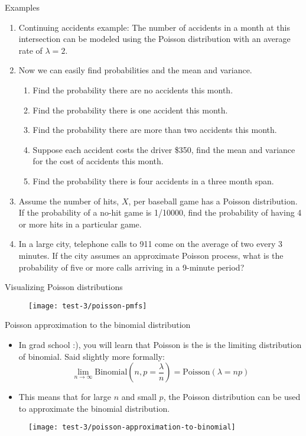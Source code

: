\documentclass{article}
\begin{document}
Examples\bigskip
\begin{enumerate}
    \item Continuing accidents example: The number of accidents in a month at this intersection can be modeled using the Poisson distribution with an average rate of $\lambda = 2$.\vspace{20pt}
    \item[] Now we can easily find probabilities and the mean and variance.
    \begin{enumerate}
        \item Find the probability there are no accidents this month.\vspace{60pt}
        \item Find the probability there is one accident this month.\vspace{60pt}
        \item Find the probability there are more than two accidents this month.\vspace{60pt}
        \item Suppose each accident costs the driver \$350, find the mean and variance for the cost of accidents this month.\vspace{180pt}
        \item Find the probability there is four accidents in a three month span.\vspace{60pt}
    \end{enumerate}
    \item Assume the number of hits, $X$, per baseball game has a Poisson distribution. If the probability of a no-hit game is 1/10000, find the probability of having 4 or more hits in a particular game.\vspace{250pt}
    \item In a large city, telephone calls to 911 come on the average of two every 3 minutes. If the city assumes an approximate Poisson process, what is the probability of five or more calls arriving in a 9-minute period?\vspace{200pt}
\end{enumerate}

\newpage

Visualizing Poisson distributions\bigskip

\begin{figure}[H]
    \center\texttt{[image: test-3/poisson-pmfs]}
\end{figure}

Poisson approximation to the binomial distribution\bigskip
\begin{itemize}
    \item In grad school :), you will learn that Poisson is the is the limiting distribution of binomial. Said slightly more formally:
     \[\lim_{n \to \infty} \text{Binomial}(n, p = \frac{\lambda}{n}) = \text{Poisson}(\lambda = np)\]
     \item This means that for large $n$ and small $p$, the Poisson distribution can be used to approximate the binomial distribution.
\end{itemize}\bigskip

\begin{figure}[H]
    \center\texttt{[image: test-3/poisson-approximation-to-binomial]}
\end{figure}
\newpage
\end{document}
